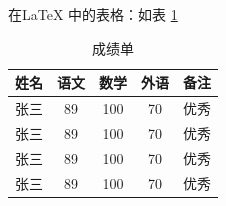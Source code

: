 \documentclass{ctexart} %
\begin{document}
	在\LaTeX{} 中的表格：如表 \ref{tab-chengjidan}
	\begin{table}[h]
		\centering
		\caption{成绩单}
		\label{tab-chengjidan}
		\begin{tabular}{l ||c |c |c |p{1.5cm}}
			\hline \hline
			姓名 & 语文 & 数学 & 外语 & 备注\\
			\hline
			张三 & 89 & 100 & 70 & 优秀\\
			张三 & 89 & 100 & 70 & 优秀\\
			张三 & 89 & 100 & 70 & 优秀\\
			张三 & 89 & 100 & 70 & 优秀\\
			
			\hline
			\hline
		\end{tabular}
	\end{table}
	
\end{document}
